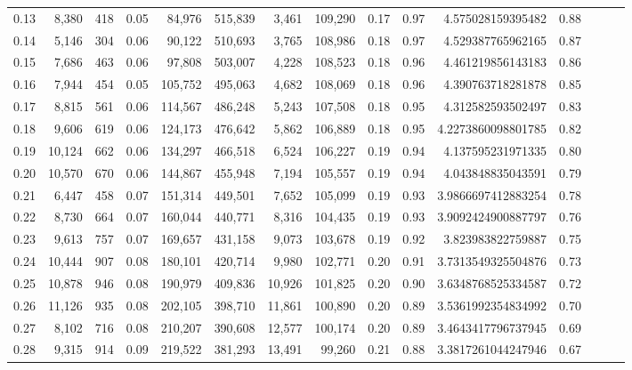 \begin{tabular}{rrrrrrrrrrrrrrr}
0.13 &   8,380 &    418 &  0.05 &   84,976 &  515,839 &    3,461 &  109,290 &  0.17 &  0.97 &    4.575028159395482 &      0.88 \\
0.14 &   5,146 &    304 &  0.06 &   90,122 &  510,693 &    3,765 &  108,986 &  0.18 &  0.97 &    4.529387765962165 &      0.87 \\
0.15 &   7,686 &    463 &  0.06 &   97,808 &  503,007 &    4,228 &  108,523 &  0.18 &  0.96 &    4.461219856143183 &      0.86 \\
0.16 &   7,944 &    454 &  0.05 &  105,752 &  495,063 &    4,682 &  108,069 &  0.18 &  0.96 &    4.390763718281878 &      0.85 \\
0.17 &   8,815 &    561 &  0.06 &  114,567 &  486,248 &    5,243 &  107,508 &  0.18 &  0.95 &    4.312582593502497 &      0.83 \\
0.18 &   9,606 &    619 &  0.06 &  124,173 &  476,642 &    5,862 &  106,889 &  0.18 &  0.95 &   4.2273860098801785 &      0.82 \\
0.19 &  10,124 &    662 &  0.06 &  134,297 &  466,518 &    6,524 &  106,227 &  0.19 &  0.94 &    4.137595231971335 &      0.80 \\
0.20 &  10,570 &    670 &  0.06 &  144,867 &  455,948 &    7,194 &  105,557 &  0.19 &  0.94 &    4.043848835043591 &      0.79 \\
0.21 &   6,447 &    458 &  0.07 &  151,314 &  449,501 &    7,652 &  105,099 &  0.19 &  0.93 &   3.9866697412883254 &      0.78 \\
0.22 &   8,730 &    664 &  0.07 &  160,044 &  440,771 &    8,316 &  104,435 &  0.19 &  0.93 &   3.9092424900887797 &      0.76 \\
0.23 &   9,613 &    757 &  0.07 &  169,657 &  431,158 &    9,073 &  103,678 &  0.19 &  0.92 &    3.823983822759887 &      0.75 \\
0.24 &  10,444 &    907 &  0.08 &  180,101 &  420,714 &    9,980 &  102,771 &  0.20 &  0.91 &   3.7313549325504876 &      0.73 \\
0.25 &  10,878 &    946 &  0.08 &  190,979 &  409,836 &   10,926 &  101,825 &  0.20 &  0.90 &   3.6348768525334587 &      0.72 \\
0.26 &  11,126 &    935 &  0.08 &  202,105 &  398,710 &   11,861 &  100,890 &  0.20 &  0.89 &   3.5361992354834992 &      0.70 \\
0.27 &   8,102 &    716 &  0.08 &  210,207 &  390,608 &   12,577 &  100,174 &  0.20 &  0.89 &   3.4643417796737945 &      0.69 \\
0.28 &   9,315 &    914 &  0.09 &  219,522 &  381,293 &   13,491 &   99,260 &  0.21 &  0.88 &   3.3817261044247946 &      0.67 \\

\end{tabular}

